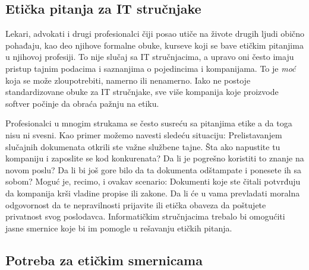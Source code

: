 \documentclass[a4paper]{article}
\begin{document}
{\subsection{Etička pitanja za IT stručnjake}

Lekari, advokati i drugi profesionalci čiji posao utiče na živote drugih ljudi obično pohađaju, kao deo njihove formalne obuke, kurseve koji se bave etičkim pitanjima u njihovoj profesiji. To nije slučaj sa IT stru\-čnja\-ci\-ma, a upravo oni često imaju pristup tajnim podacima i saznanjima o pojedincima i kompanijama. To je \emph{moć} koja se može zloupotrebiti, namerno ili nenamerno. Iako ne postoje standardizovane obuke za IT stručnjake, sve više kompanija koje proizvode softver počinje da obraća pažnju na etiku.

Profesionalci u mnogim strukama se često susreću sa pitanjima etike a da toga nisu ni svesni. Kao primer možemo navesti sledeću situaciju: Prelistavanjem slučajnih dokumenata otkrili ste važne službene tajne. Šta ako napustite tu kompaniju i zaposlite se kod konkurenata? Da li je pogrešno koristiti to znanje na novom poslu? Da li bi još gore bilo da ta dokumenta odštampate i ponesete ih sa sobom?
Moguć je, recimo, i ovakav scenario: Dokumenti koje ste čitali potvrđuju da kompanija krši vladine propise ili zakone. Da li će u vama prevladati moralna odgovornost da te nepravilnosti prijavite ili etička obaveza da poštujete privatnost svog poslodavca.\cite{Schneider}\cite{Reynolds}
Informatičkim stručnjacima trebalo bi omogućiti jasne smernice koje bi im pomogle u rešavanju etičkih pitanja.

\subsection{Potreba za etičkim smernicama}

}
\end{document}
